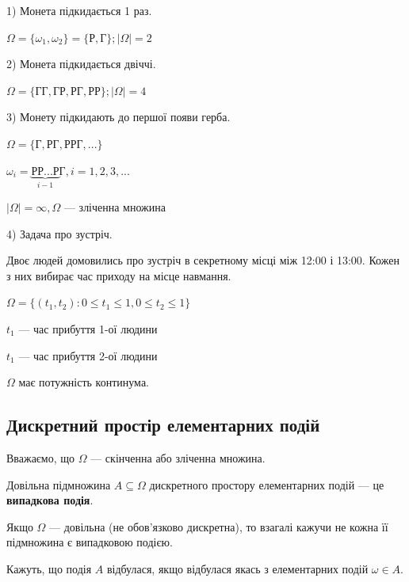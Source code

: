 \begin{example}
    1) Монета підкидається 1 раз.

    $\Omega = \{\omega_1, \omega_2\} 
    = \{\text{Р}, \text{Г}\}; |\Omega| = 2$

    2) Монета підкидається двіччі.

    $\Omega = \{\text{ГГ}, \text{ГР}, \text{РГ}, \text{РР}\}; |\Omega| = 4$

    3) Монету підкидають до першої появи герба.

    $\Omega = \{\text{Г}, \text{РГ}, \text{РРГ}, ...\}$
    
    $\omega_i = \underbrace{\text{РР...Р}}\limits_{i-1}\text{Г}, i = 1, 2, 3, ...$
    
    $|\Omega| = \infty, \Omega \text{ --- зліченна множина}$

    4) Задача про зустріч.

    Двоє людей домовились про зустріч в секретному місці
    між 12:00 і 13:00. Кожен з них вибирає час приходу на
    місце навмання.

    $\Omega = \{(t_1, t_2): 0 \leqslant t_1 \leqslant 1,
    0 \leqslant t_2 \leqslant 1\}$

    $t_1$ --- час прибуття 1-ої людини

    $t_1$ --- час прибуття 2-ої людини

    $\Omega$ має потужність континума.
\end{example}

\subsection{Дискретний простір елементарних подій}

Вважаємо, що $\Omega$ --- скінченна або зліченна множина.

 \begin{definition}
    Довільна підмножина $A \subseteq \Omega$ дискретного
    простору елементарних подій --- це \textbf{випадкова
    подія}.
 \end{definition}

 \begin{remark}
    Якщо $\Omega$ --- довільна (не обов'язково дискретна),
    то взагалі кажучи не кожна її підмножина є випадковою
    подією.
 \end{remark}

 Кажуть, що подія $A$ відбулася, якщо відбулася якась з 
 елементарних подій $\omega \in A$.

